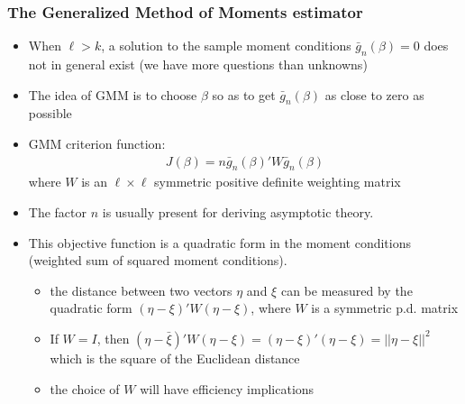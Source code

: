 \documentclass[a4paper,twoside,11pt]{article}
\begin{document}
\subsubsection{The Generalized Method of Moments estimator}
\begin{itemize}
    \item When $\ell >k$, a solution to the sample moment conditions $\bar g_n (\beta)=0$ does not in general exist (we have more questions than unknowns)
    \item The idea of GMM is to choose $\beta$ so as to get $\bar g_n (\beta)$ as close to zero as possible 
    \item GMM criterion function:
\newline
\begin{equation*}
\begin{aligned}
J (\beta) = n \bar g_n (\beta)' W \bar g_n (\beta)
\end{aligned} 
\end{equation*}
where $W$ is an $\ell \times \ell$ symmetric positive definite weighting matrix
    \item The factor $n$ is usually present for deriving asymptotic theory.
    \item This objective function is a quadratic form in the moment conditions (weighted sum of squared moment conditions).
    \begin{itemize}
        \item the distance between two vectors $\eta$ and $\xi$ can be measured by the quadratic form $(\eta - \xi)' W (\eta - \xi)$, where $W$ is a symmetric p.d. matrix
        \item If $W=I$, then $(\eta - \bar \xi)' W ( \eta - \xi) = (\eta - \xi)' (\eta - \xi) = || \eta - \xi||^2$ which is the square of the Euclidean distance
        \item the choice of $W$ will have efficiency implications
    \end{itemize}
\end{itemize}
\end{document}
